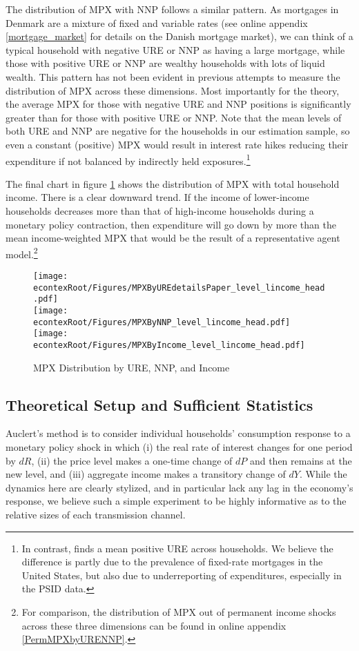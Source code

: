\documentclass[titlepage]{\econtex}\newcommand{\texname}{ConsumptionHeterogeneity}
\begin{document}
	The distribution of MPX with NNP follows a similar pattern. As mortgages in Denmark are a mixture of fixed and variable rates (see online appendix \ref{mortgage_market} for details on the Danish mortgage market), we can think of a typical household with negative URE or NNP as having a large mortgage, while those with positive URE or NNP are wealthy households with lots of liquid wealth. This pattern has not been evident in previous attempts to measure the distribution of MPX across these dimensions. Most importantly for the theory, the average MPX for those with negative URE and NNP positions is significantly greater than for those with positive URE or NNP. Note that the mean levels of both URE and NNP are negative for the households in our estimation sample, so even a constant (positive) MPX would result in interest rate hikes reducing their expenditure if not balanced by indirectly held exposures.\footnote{In contrast, \cite{auclert_monetary_2017} finds a mean positive URE across households. We believe the difference is partly due to the prevalence of fixed-rate mortgages in the United States, but also due to underreporting of expenditures, especially in the PSID data.}
	
	The final chart in figure \ref{fig:MPCAuclert} shows the distribution of MPX with total household income. There is a clear downward trend. If the income of lower-income households decreases more than that of high-income households during a monetary policy contraction, then expenditure will go down by more than the mean income-weighted MPX that would be the result of a representative agent model.\footnote{For comparison, the distribution of  MPX out of permanent income shocks across these three dimensions can be found in online appendix \ref{PermMPXbyURENNP}.}
	\begin{figure} 
		\begin{centering}
			\texttt{[image: \\econtexRoot/Figures/MPXByUREdetailsPaper\_level\_lincome\_head.pdf]} \\
			\texttt{[image: \\econtexRoot/Figures/MPXByNNP\_level\_lincome\_head.pdf]}
			\texttt{[image: \\econtexRoot/Figures/MPXByIncome\_level\_lincome\_head.pdf]}
			\caption{MPX Distribution by URE, NNP, and Income}
			\label{fig:MPCAuclert}
		\end{centering}
	\end{figure}
	
	\subsection{Theoretical Setup and Sufficient Statistics} \label{auclert_theory}
	Auclert's method is to consider individual households' consumption response to a monetary policy shock in which (i) the real rate of interest changes for one period by $dR$, (ii) the price level makes a one-time change of $dP$ and then remains at the new level, and (iii) aggregate income makes a transitory change of $dY$. While the dynamics here are clearly stylized, and in particular lack any lag in the economy's response, we believe such a simple experiment to be highly informative as to the relative sizes of each transmission channel.
	
\end{document}
